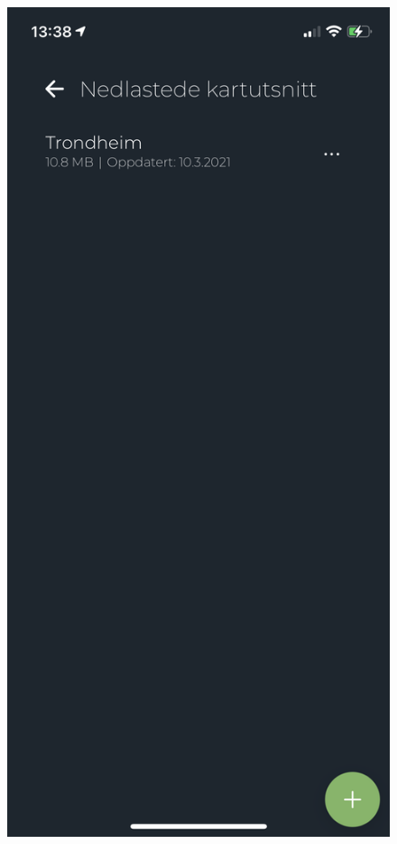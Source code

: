 \begin{figure}[H]
  \centering
  \begin{minipage}[b]{0.4\textwidth}
    \centering
    \includegraphics[scale=0.4]{Figurer/skjermbilder/nedlastede-kartutsnitt.png}

\end{minipage}
\end{figure}
